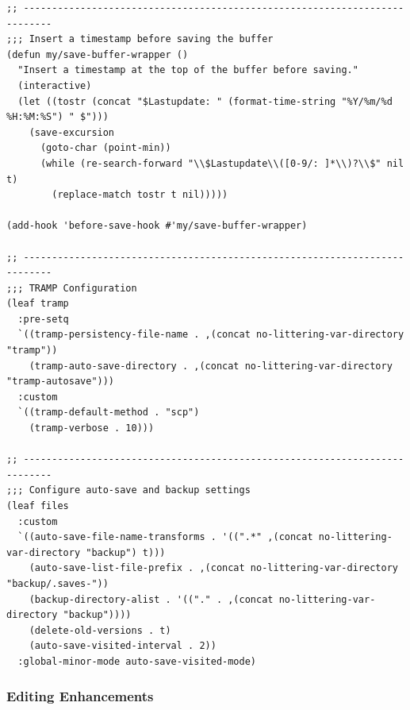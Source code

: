 \documentclass[11pt]{article}
\begin{document}
\begin{verbatim}
;; ---------------------------------------------------------------------------
;;; Insert a timestamp before saving the buffer
(defun my/save-buffer-wrapper ()
  "Insert a timestamp at the top of the buffer before saving."
  (interactive)
  (let ((tostr (concat "$Lastupdate: " (format-time-string "%Y/%m/%d %H:%M:%S") " $")))
    (save-excursion
      (goto-char (point-min))
      (while (re-search-forward "\\$Lastupdate\\([0-9/: ]*\\)?\\$" nil t)
        (replace-match tostr t nil)))))

(add-hook 'before-save-hook #'my/save-buffer-wrapper)

;; ---------------------------------------------------------------------------
;;; TRAMP Configuration
(leaf tramp
  :pre-setq
  `((tramp-persistency-file-name . ,(concat no-littering-var-directory "tramp"))
    (tramp-auto-save-directory . ,(concat no-littering-var-directory "tramp-autosave")))
  :custom
  `((tramp-default-method . "scp")
    (tramp-verbose . 10)))

;; ---------------------------------------------------------------------------
;;; Configure auto-save and backup settings
(leaf files
  :custom
  `((auto-save-file-name-transforms . '((".*" ,(concat no-littering-var-directory "backup") t)))
    (auto-save-list-file-prefix . ,(concat no-littering-var-directory "backup/.saves-"))
    (backup-directory-alist . '(("." . ,(concat no-littering-var-directory "backup"))))
    (delete-old-versions . t)
    (auto-save-visited-interval . 2))
  :global-minor-mode auto-save-visited-mode)
\end{verbatim}
\subsubsection{Editing Enhancements}
\label{sec:org91dda26}
\end{document}
